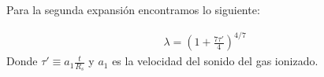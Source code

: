







Para la segunda expansión encontramos lo siguiente:

\begin{align}
  \lambda = \left(1 + \frac{7\tau'}{4}\right)^{4/7}
\end{align}
Donde $\tau' \equiv a_1 \frac{t}{R_s}$ y $a_1$ es la velocidad del sonido del gas ionizado.

